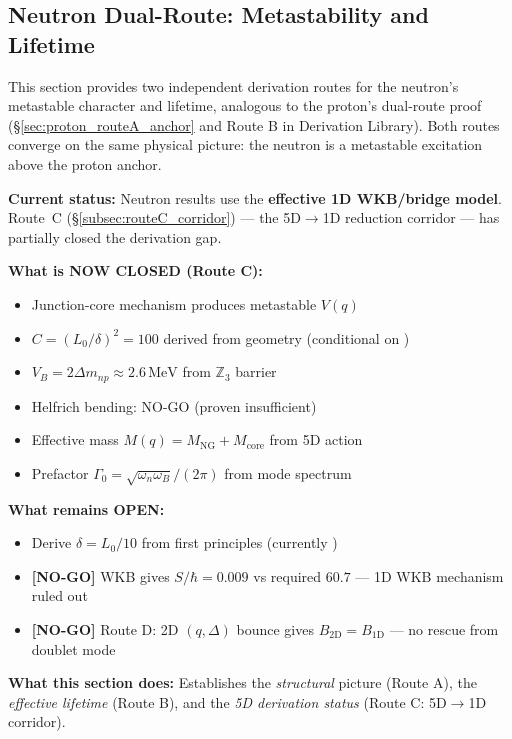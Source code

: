 
\subsection{Neutron Dual-Route: Metastability and Lifetime}
\label{sec:neutron_dual_route}

This section provides two independent derivation routes for the neutron's metastable
character and lifetime, analogous to the proton's dual-route proof (\S\ref{sec:proton_routeA_anchor}
and Route B in Derivation Library). Both routes converge on the same physical picture:
the neutron is a metastable excitation above the proton anchor.

\begin{tcolorbox}[colback=yellow!5!white, colframe=yellow!50!black,
                  title={\textbf{5D Forensic Audit Statement}}]
\textbf{Current status:} Neutron results use the \textbf{effective 1D WKB/bridge model}.
Route~C (\S\ref{subsec:routeC_corridor}) --- the 5D$\to$1D reduction corridor --- has partially closed the derivation gap.

\textbf{What is NOW CLOSED (Route C):}
\begin{itemize}[nosep]
  \item Junction-core mechanism produces metastable $V(q)$ \tagDc{}
  \item $C = (L_0/\delta)^2 = 100$ derived from geometry \tagDc{} (conditional on \tagI{})
  \item $V_B = 2\Delta m_{np} \approx 2.6\,\mathrm{MeV}$ from $\mathbb{Z}_3$ barrier \tagDc{}
  \item Helfrich bending: NO-GO (proven insufficient) \tagDc{}
  \item Effective mass $M(q) = M_{\mathrm{NG}} + M_{\mathrm{core}}$ from 5D action \tagDc{}
  \item Prefactor $\Gamma_0 = \sqrt{\omega_n\omega_B}/(2\pi)$ from mode spectrum \tagDc{}
\end{itemize}

\textbf{What remains OPEN:}
\begin{itemize}[nosep]
  \item Derive $\delta = L_0/10$ from first principles (currently \tagI{})
  \item \textbf{[NO-GO]} WKB gives $S/\hbar = 0.009$ vs required $60.7$ --- 1D WKB mechanism ruled out
  \item \textbf{[NO-GO]} Route D: 2D $(q,\Delta)$ bounce gives $B_{2\mathrm{D}} = B_{1\mathrm{D}}$ --- no rescue from doublet mode
\end{itemize}

\textbf{What this section does:} Establishes the \emph{structural} picture (Route A),
the \emph{effective lifetime} (Route B), and the \emph{5D derivation status} (Route C: 5D$\to$1D corridor).
\end{tcolorbox}


